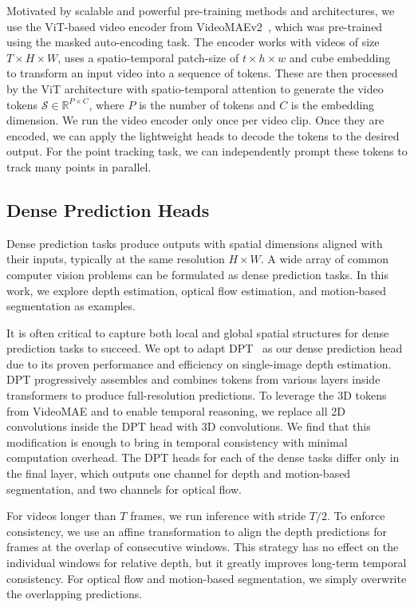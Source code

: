 Motivated by scalable and powerful pre-training methods and architectures, we use the ViT-based video encoder from VideoMAEv2~\cite{wang2023videomaev2}, which was pre-trained using the masked auto-encoding task.
The encoder works with videos of size $T \times H \times W$, uses a spatio-temporal patch-size of $t \times h \times w$ and cube embedding~\cite{tong2022videomae} to transform an input video into a sequence of tokens.
These are then processed by the ViT architecture with spatio-temporal attention to generate the video tokens $\mathcal{S} \in \mathbb{R}^{P \times C}$, where $P$ is the number of tokens and $C$ is the embedding dimension.
We run the video encoder only once per video clip.
Once they are encoded, we can apply the lightweight heads to decode the tokens to the desired output.
For the point tracking task, we can independently prompt these tokens to track many points in parallel. 

\subsection{Dense Prediction Heads}\label{sec:method_dense}
Dense prediction tasks produce outputs with spatial dimensions aligned with their inputs, typically at the same resolution $H \times W$.  
A wide array of common computer vision problems can be formulated as dense prediction tasks. 
In this work, we explore depth estimation, optical flow estimation, and motion-based segmentation as examples.

It is often critical to capture both local and global spatial structures for dense prediction tasks to succeed. 
We opt to adapt DPT~\cite{ranftl2021dpt} as our dense prediction head due to its proven performance and efficiency on single-image depth estimation. 
DPT progressively assembles and combines tokens from various layers inside transformers to produce full-resolution predictions. 
To leverage the 3D tokens from VideoMAE and to enable temporal reasoning, we replace all 2D convolutions inside the DPT head with 3D convolutions. 
We find that this modification is enough to bring in temporal consistency with minimal computation overhead. 
The DPT heads for each of the dense tasks differ only in the final layer, which outputs one channel for depth and motion-based segmentation, and two channels for optical flow.

For videos longer than $T$ frames, we run inference with stride $T/2$.
To enforce consistency, we use an affine transformation to align the depth predictions for frames at the overlap of consecutive windows. 
This strategy has no effect on the individual windows for relative depth, but it greatly improves long-term temporal consistency.
For optical flow and motion-based segmentation, we simply overwrite the overlapping predictions. 


